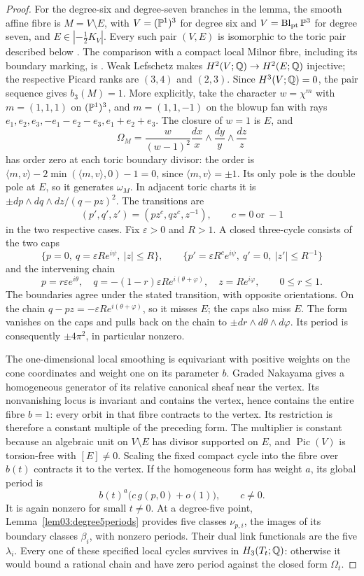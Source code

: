 \begin{proof}
For the degree-six and degree-seven branches in the lemma, the smooth affine fibre is
$M=V\setminus E$, with $V=(\mathbb{P}^1)^3$ for degree six and
$V=\operatorname{Bl}_{\mathrm{pt}}\mathbb{P}^3$ for degree seven, and
$E\in|-\tfrac12K_V|$.  Every such pair $(V,E)$ is isomorphic to the toric
pair described below \cite[\S3.3]{PaperIV}.  The comparison with a compact
local Milnor fibre, including its boundary marking, is
\cite[Lem.~4.2]{PaperIV}.  Weak Lefschetz makes
$H^2(V;\mathbb{Q})\to H^2(E;\mathbb{Q})$ injective; the respective Picard
ranks are $(3,4)$ and $(2,3)$.  Since $H^3(V;\mathbb{Q})=0$, the pair
sequence gives $b_3(M)=1$.  More explicitly, take the character
$w=\chi^m$ with $m=(1,1,1)$ on $(\mathbb{P}^1)^3$, and $m=(1,1,-1)$
on the blowup fan with rays $e_1,e_2,e_3,-e_1-e_2-e_3,e_1+e_2+e_3$.
The closure of $w=1$ is $E$, and
\[
 \Omega_M=\frac{w}{(w-1)^2}
      \frac{dx}{x}\wedge\frac{dy}{y}\wedge\frac{dz}{z}
\]
has order zero at each toric boundary divisor: the order is
$\langle m,v\rangle-2\min(\langle m,v\rangle,0)-1=0$, since
$\langle m,v\rangle=\pm1$.  Its only pole is the double pole at
$E$, so it generates $\omega_M$.  In adjacent toric charts it is
$\pm dp\wedge dq\wedge dz/(q-pz)^2$.  The transitions are
\[
 (p',q',z')=(pz^c,qz^c,z^{-1}),\qquad
 c=0\ \text{or}\ -1
\]
in the two respective cases.  Fix $\varepsilon>0$ and $R>1$.
A closed three-cycle consists of the two caps
\[
 \{p=0,\ q=\varepsilon R e^{i\psi},\ |z|\le R\},\qquad
 \{p'=\varepsilon R^c e^{i\psi},\ q'=0,\ |z'|\le R^{-1}\}
\]
and the intervening chain
\[
 p=r\varepsilon e^{i\theta},\quad
 q=-(1-r)\varepsilon R e^{i(\theta+\varphi)},\quad
 z=R e^{i\varphi},\qquad 0\le r\le1.
\]
The boundaries agree under the stated transition, with opposite
orientations.  On the chain $q-pz=-\varepsilon R
e^{i(\theta+\varphi)}$, so it misses $E$; the caps also miss $E$.
The form vanishes on the caps and pulls back on the chain to
$\pm dr\wedge d\theta\wedge d\varphi$.  Its period is consequently
$\pm4\pi^2$, in particular nonzero.

The one-dimensional local smoothing is equivariant with positive
weights on the cone coordinates and weight one on its parameter
$b$.  Graded Nakayama gives a homogeneous generator of its relative
canonical sheaf near the vertex.  Its nonvanishing locus is invariant
and contains the vertex, hence contains the entire fibre $b=1$:
every orbit in that fibre contracts to the vertex.  Its restriction
is therefore a constant multiple of the preceding form.
The multiplier is constant because an algebraic unit on $V\setminus E$
has divisor supported on $E$, and $\operatorname{Pic}(V)$ is
torsion-free with $[E]\ne0$.  Scaling the fixed compact cycle into
the fibre over $b(t)$ contracts it to the vertex.  If the homogeneous
form has weight $a$, its global period is
\[
 b(t)^a\bigl(c\,g(p,0)+o(1)\bigr),\qquad c\ne0.
\]
It is again nonzero for small $t\ne0$.
At a degree-five point, Lemma~\ref{lem03:degree5periods}
provides five classes $\nu_{p,i}$, the images of its boundary
classes $\beta_i$, with nonzero periods.  Their dual link
functionals are the five $\lambda_i$.
Every one of these specified local cycles survives in
$H_3(T_t;\mathbb{Q})$: otherwise it would bound a rational chain and
have zero period against the closed form $\Omega_t$.


\end{proof}
